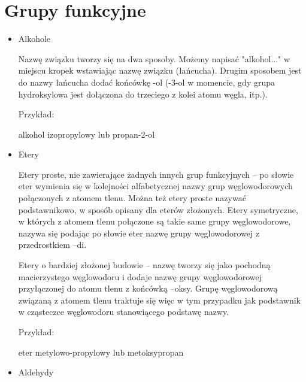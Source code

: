 \section{Grupy funkcyjne}
\begin{itemize}
    \item Alkohole
    
    \newline

    Nazwę związku tworzy się na dwa sposoby. Możemy napisać  "alkohol..." w miejscu kropek wstawiając nazwę związku (łańcucha). Drugim sposobem jest do nazwy łańcucha dodać końcówkę -ol (-3-ol w momencie, gdy grupa hydroksylowa jest dołączona do trzeciego z kolei atomu węgla, itp.).

    \begin{center}
        Przykład:
        
        
        alkohol izopropylowy lub propan-2-ol
    \end{center}

    \item Etery
    
    \newline

    Etery proste, nie zawierające żadnych innych grup funkcyjnych – po słowie eter wymienia się w kolejności alfabetycznej nazwy grup węglowodorowych połączonych z atomem tlenu. Można też etery proste nazywać podstawnikowo, w sposób opisany dla eterów złożonych. Etery symetryczne, w których z atomem tlenu połączone są takie same grupy węglowodorowe, nazywa się podając po słowie eter nazwę grupy węglowodorowej z przedrostkiem –di.

    Etery o bardziej złożonej budowie – nazwę tworzy się jako pochodną macierzystego węglowodoru i dodaje nazwę grupy węglowodorowej przyłączonej do atomu tlenu z końcówką –oksy. Grupę węglowodorową związaną z atomem tlenu traktuje się więc w tym przypadku jak podstawnik w cząsteczce węglowodoru stanowiącego podstawę nazwy.
    \newline

    \begin{center}
    Przykład:

    
    eter metylowo-propylowy lub metoksypropan
\end{center}
    \item Aldehydy
    

\end{itemize}
